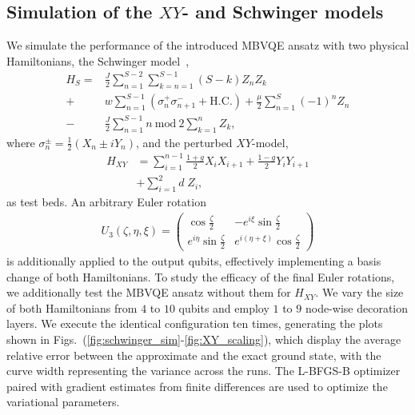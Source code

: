\documentclass[../main.tex]{subfiles}
\begin{document}
\subsection{Simulation of the $XY$- and Schwinger models}
We simulate the performance of the introduced MBVQE ansatz with two physical Hamiltonians, the Schwinger model~\cite{schwinger1951the,klco2018quantum},
\begin{align}
    H_S = & \frac{J}{2} \sum^{S-2}_{n=1} \sum^{S-1}_{k=n=1} (S-k) Z_n Z_k \nonumber\\
      +& w\sum^{S-1}_{n=1} (\sigma^{+}_{n}\sigma^{-}_{n+1} + \mathrm{H.C.})   + \frac{\mu}{2} \sum^{S}_{n=1} (-1)^{n} Z_n \nonumber \\ 
     -& \frac{J}{2} \sum^{S-1}_{n=1} n \ \mathrm{mod} \ 2 \sum^{n}_{k=1} Z_k 
     , 
\end{align}
where $\sigma^{\pm}_{n} = \frac{1}{2} (X_n \pm iY_n)$, and the perturbed $XY$-model,
 \begin{align}
     H_{XY}&=\sum_{i=1}^{n-1} \frac{1+g}{2} X_i X_{i+1}+\frac{1-g}{2}Y_i Y_{i+1}\nonumber\\
     &+ \sum_{i=1}^{2} d\; Z_i , 
 \end{align}
as test beds. 
An arbitrary Euler rotation
\begin{align}
U_3(\zeta, \eta, \xi) = \begin{pmatrix} \cos\frac{\zeta}{2} & -e^{i\xi}\sin\frac{\zeta}{2} \\ e^{i\eta}\sin\frac{\zeta}{2} & e^{i(\eta+\xi)}\cos\frac{\zeta}{2}\end{pmatrix} \end{align}
is additionally applied to the output qubits, effectively implementing a basis change of both Hamiltonians. To study the efficacy of the final Euler rotations, we additionally test the MBVQE ansatz without them for $H_{XY}$.
We vary the size of both Hamiltonians from $4$ to $10$ qubits and employ $1$ to $9$ node-wise decoration layers. 
We execute the identical configuration ten times, generating the plots shown in Figs.~(\ref{fig:schwinger_sim}-\ref{fig:XY_scaling}), which display the average relative error between the approximate and the exact ground state, with the curve width representing the variance across the runs. The L-BFGS-B optimizer~\cite{liu1989on} paired with gradient estimates from finite differences are used to optimize the variational parameters.
\end{document}
